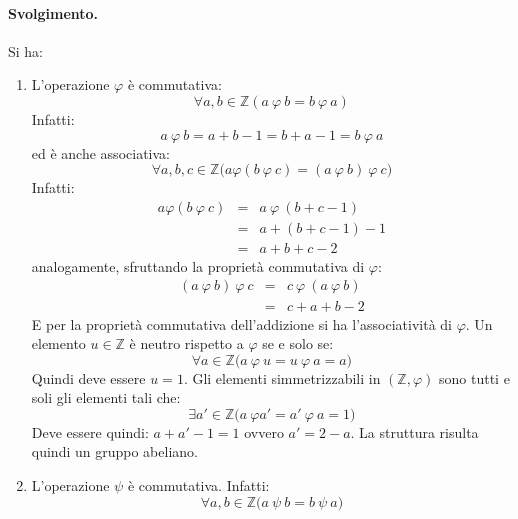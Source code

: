 \paragraph*{Svolgimento.} Si ha:
\begin{enumerate}
	\item L'operazione $\varphi$ è commutativa:
	\begin{displaymath}
		\forall a,b \in \mathbb{Z}(	a \ \varphi \  b = b \  \varphi \ a )
	\end{displaymath}
	Infatti:
	\begin{displaymath}
		a \ \varphi \  b = a+b-1=b+a-1= b \  \varphi \ a
	\end{displaymath}
	ed è anche associativa:
	\begin{displaymath}
		\forall a,b,c \in \mathbb{Z} \bigl( a \varphi (b \ \varphi \ c) = (a \ \varphi \ b) \ \varphi \ c \bigr)
	\end{displaymath}
	Infatti:
	\begin{eqnarray*}
		a \varphi (b \ \varphi \ c) &=& a \ \varphi \ (b+c-1) \\
		&=& a+(b+c-1)-1 \\
		&=& a+b+c-2
	\end{eqnarray*}
	analogamente, sfruttando la proprietà commutativa di $\varphi$:
	\begin{eqnarray*}
		(a \ \varphi \ b) \ \varphi \ c &=& c \ \varphi \ (a \ \varphi \ b) \\
		&=& c +a +b -2
	\end{eqnarray*}
	E per la proprietà commutativa dell'addizione si ha l'associatività di $\varphi$. Un elemento $u \in \mathbb{Z}$ è neutro rispetto a $\varphi$ se e solo se:
	\begin{displaymath}
		\forall a \in \mathbb{Z} \bigl( a \ \varphi \ u = u \ \varphi \ a = a \bigl)
	\end{displaymath}
	Quindi deve essere $u=1$. Gli elementi simmetrizzabili in $(\mathbb{Z}, \varphi)$ sono tutti e soli gli elementi tali che:
	\begin{displaymath}
		\exists a' \in \mathbb{Z} \bigl( a \ \varphi a' = a' \ \varphi \ a = 1 \bigr)
	\end{displaymath}
	Deve essere quindi: $a+a'-1=1$ ovvero $a'=2-a$. La struttura risulta quindi un gruppo abeliano.
	\item L'operazione $\psi$ è commutativa. Infatti:
	\begin{displaymath}
		\forall a,b \in \mathbb{Z} \bigl( a \ \psi \ b = b \ \psi \ a \bigr)
	\end{displaymath}

\end{enumerate}
